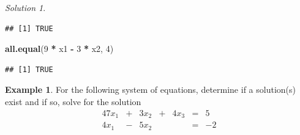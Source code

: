 \documentclass[
]{book}
\newenvironment{Shaded}{\begin{snugshade}}{\end{snugshade}}
\newcommand{\DecValTok}[1]{\textcolor[rgb]{0.00,0.00,0.81}{#1}}
\newcommand{\KeywordTok}[1]{\textcolor[rgb]{0.13,0.29,0.53}{\textbf{#1}}}
\newcommand{\NormalTok}[1]{#1}
\newcommand{\OperatorTok}[1]{\textcolor[rgb]{0.81,0.36,0.00}{\textbf{#1}}}
\newcommand{\StringTok}[1]{\textcolor[rgb]{0.31,0.60,0.02}{#1}}
\theoremstyle{definition}
\theoremstyle{definition}
\newtheorem{example}{Example}[chapter]
\theoremstyle{definition}
\theoremstyle{definition}
\theoremstyle{remark}
\newtheorem*{solution}{Solution}
\begin{document}
\begin{solution}
\begin{verbatim}
## [1] TRUE
\end{verbatim}

\begin{Shaded}
\begin{Highlighting}[]
\KeywordTok{all.equal}\NormalTok{(}\DecValTok{9} \OperatorTok{*}\StringTok{ }\NormalTok{x1 }\OperatorTok{-}\StringTok{ }\DecValTok{3} \OperatorTok{*}\StringTok{ }\NormalTok{x2, }\DecValTok{4}\NormalTok{)}
\end{Highlighting}
\end{Shaded}

\begin{verbatim}
## [1] TRUE
\end{verbatim}

\end{solution}

\begin{example}
For the following system of equations, determine if a solution(s) exist and if so, solve for the solution
\begin{alignat*}{4}
7 x_1 & {}+{} & 3 x_2 & {}+{} & 4 x_3 & {}={} & 5\\
4 x_1 & {}-{} & 5 x_2 &&        & {}={} & -2
\end{alignat*}
\end{example}
\end{document}
